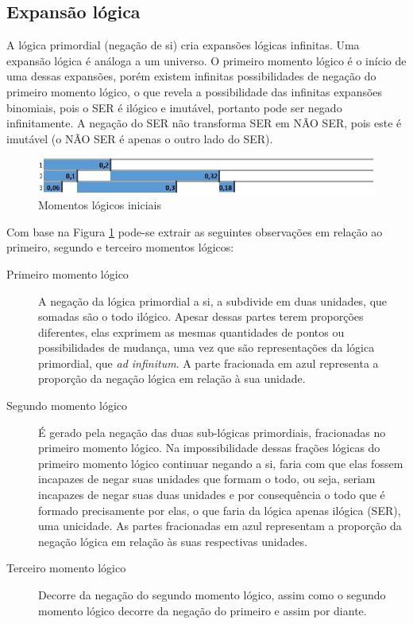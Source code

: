 \subsection{Expansão lógica}
A lógica primordial (negação de si) cria expansões lógicas infinitas. Uma expansão lógica é análoga a um universo. O primeiro momento lógico é o início de uma dessas expansões, porém existem infinitas possibilidades de negação do primeiro momento lógico, o que revela a possibilidade das infinitas expansões binomiais, pois o SER é ilógico e imutável, portanto pode ser negado infinitamente. A negação do SER não transforma SER em NÃO SER, pois este é imutável (o NÃO SER é apenas o outro lado do SER). 
\begin{figure}[H]
\caption{Momentos lógicos iniciais}
\label{fig:third_logical_moment}
\centering
\includegraphics[scale=.85]{sections/images/third_logical_moment.jpg}
\end{figure}

Com base na Figura \ref{fig:third_logical_moment} pode-se extrair as seguintes observações em relação ao primeiro, segundo e terceiro momentos lógicos:
\begin{description}
   \item[Primeiro momento lógico] A negação da lógica primordial a si, a subdivide em duas unidades, que somadas são o todo ilógico. Apesar dessas partes terem proporções diferentes, elas exprimem as mesmas quantidades de pontos ou possibilidades de mudança, uma vez que são representações da lógica primordial, que \textit{ad infinitum}. A parte fracionada em azul representa a proporção da negação lógica em relação à sua unidade.
   \item[Segundo momento lógico] É gerado pela negação das duas sub-lógicas primordiais, fracionadas no primeiro momento lógico. Na impossibilidade dessas frações lógicas do primeiro momento lógico continuar negando a si, faria com que elas fossem incapazes de negar suas unidades que formam o todo, ou seja, seriam incapazes de negar suas duas unidades e por consequência o todo que é formado precisamente por elas, o que faria da lógica apenas ilógica (SER), uma unicidade. As partes fracionadas em azul representam a proporção da negação lógica em relação às suas respectivas unidades.
   \item[Terceiro momento lógico] Decorre da negação do segundo momento lógico, assim como o segundo momento lógico decorre da negação do primeiro e assim por diante.
\end{description}

